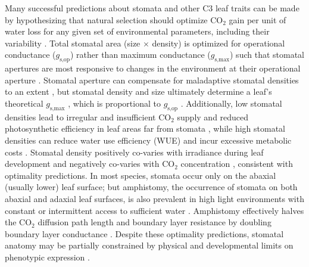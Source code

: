 \documentclass[webpdf,large,modern,unnumsec,namedate]{oup-authoring-template}
\begin{document}
Many successful predictions about stomata and other C3 leaf traits can
be made by hypothesizing that natural selection should optimize CO\(_2\)
gain per unit of water loss for any given set of environmental
parameters, including their variability
\citep{cowan_stomatal_1977, buckley_optimal_2017, sperry_predicting_2017}.
Total stomatal area (size \(\times\) density) is optimized for
operational conductance (\(g_\text{s,op}\)) rather than maximum
conductance (\(g_\text{s,max}\)) such that stomatal apertures are most
responsive to changes in the environment at their operational aperture
\citep{franks_physiological_2012, liu_scaling_2021}. Stomatal aperture
can compensate for maladaptive stomatal densities to an extent
\citep{bussis_stomatal_2006}, but stomatal density and size ultimately
determine a leaf's theoretical \(g_\text{s,max}\)
\citep{sack_developmental_2016}, which is proportional to
\(g_\text{s,op}\) \citep{murray_consistent_2020}. Additionally, low
stomatal densities lead to irregular and insufficient CO\(_2\) supply
and reduced photosynthetic efficiency in leaf areas far from stomata
\citep{pieruschka_lateral_2006, morison_lateral_2005}, while high
stomatal densities can reduce water use efficiency (WUE)
\citep{bussis_stomatal_2006} and incur excessive metabolic costs
\citep{deans_optimization_2020}. Stomatal density positively co-varies
with irradiance during leaf development and negatively co-varies with
CO\(_2\) concentration
\citep{gay_influence_1975, schoch_dependence_1980, woodward_stomatal_1987, royer_stomatal_2001},
consistent with optimality predictions. In most species, stomata occur
only on the abaxial (usually lower) leaf surface; but amphistomy, the
occurrence of stomata on both abaxial and adaxial leaf surfaces, is also
prevalent in high light environments with constant or intermittent
access to sufficient water
\citep{mott_adaptive_1982, jordan_using_2014, muir_light_2018, drake_two_2019, muir_is_2019}.
Amphistomy effectively halves the CO\(_2\) diffusion path length and
boundary layer resistance by doubling boundary layer conductance
\citep{parkhurst_adaptive_1978, harrison_influence_2020, mott_amphistomy_1991}.
Despite these optimality predictions, stomatal anatomy may be partially
constrained by physical and developmental limits on phenotypic
expression
\citep{croxdale_stomatal_2000, harrison_influence_2020, muir_how_2023}.
\end{document}

